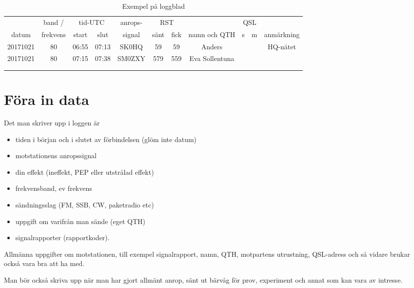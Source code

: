 \begin{table*}[b]
  \qquad
  \begin{tabular}{|c|c|c|c|c|c|c|c|c|c|c|}
    \hline
    & band / & \multicolumn{2}{|c|}{tid-UTC} & anrops- & \multicolumn{2}{|c|}{RST} & &
                                                                                       \multicolumn{2}{|c|}{QSL} & \\
    datum & frekvens & start & slut & signal & sänt & fick & namn och QTH & s & m & anmärkning \\
    \hline
    \hline
    20171021 & 80 & 06:55 & 07:13 & SK0HQ & 59 & 59 & Anders & & & HQ-nätet \\
    \hline
    20171021 & 80 & 07:15 & 07:38 & SM0ZXY & 579 & 559 & Eva Sollentuna & & & \\
    \hline
    & & & & & & & & & & \\
    \hline
    & & & & & & & & & & \\
    \hline
  \end{tabular}
  \caption{Exempel på loggblad}
  \label{tab:loggblad}
\end{table*}

\newpage %
\section{Föra in data}

Det man skriver upp i loggen är
\begin{itemize}
  \item tiden i början och i slutet av förbindelsen (glöm inte datum)
  \item motstationens anropssignal
  \item din effekt (ineffekt, PEP eller utstrålad effekt)
  \item frekvensband, ev frekvens
  \item sändningsslag (FM, SSB, CW, paketradio etc)
  \item uppgift om varifrån man sände (eget QTH)
  \item signalrapporter (rapportkoder).
\end{itemize}

Allmänna uppgifter om motstationen, till exempel signalrapport, namn, QTH,
motpartens utrustning, QSL-adress och så vidare brukar också vara bra att ha
med.

Man bör också skriva upp när man har gjort allmänt anrop, sänt ut bärvåg för
prov, experiment och annat som kan vara av intresse.

